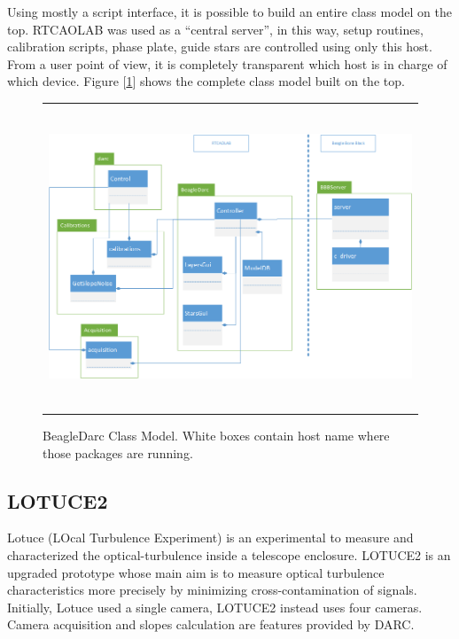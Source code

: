 \documentclass[]{spie}  %
\begin{document}
Using mostly a script interface, it is possible to build an entire class model on
the top. RTCAOLAB was used as a ``central server'', in this way, setup routines,
    calibration scripts, phase plate, guide stars are controlled using only
    this host. From a user point of view, it is completely transparent which host
    is in charge of which device. Figure [\ref{fig:class}] shows the complete class
    model built on the top.

   \begin{figure}[!ht]
   \begin{center}
   \begin{tabular}{c}
   \includegraphics[height=9.0cm]{../img/class_model2.png}
   \end{tabular}
   \end{center}
   \caption[class] 
   { \label{fig:class} BeagleDarc Class Model. White boxes contain host name where those packages are running.}
   \end{figure}

\subsection{LOTUCE2}
Lotuce (LOcal Turbulence Experiment) is an experimental to measure and
characterized the optical-turbulence inside a telescope enclosure. LOTUCE2 is
an upgraded prototype whose main aim is to measure optical turbulence
characteristics more precisely by minimizing cross-contamination of signals.
Initially, Lotuce used a single camera, LOTUCE2 instead  uses four cameras.
Camera acquisition and slopes calculation are features provided by DARC.
\end{document}

